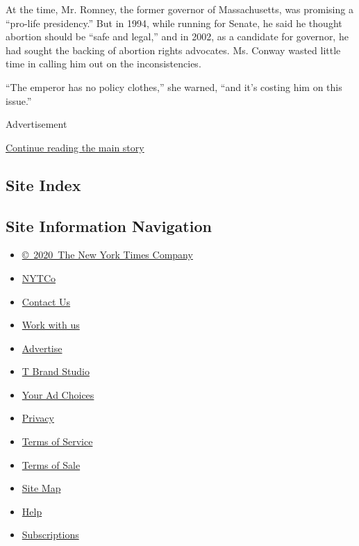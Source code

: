 At the time, Mr. Romney, the former governor of Massachusetts, was
promising a ``pro-life presidency.'' But in 1994, while running for
Senate, he said he thought abortion should be ``safe and legal,'' and in
2002, as a candidate for governor, he had sought the backing of abortion
rights advocates. Ms. Conway wasted little time in calling him out on
the inconsistencies.

``The emperor has no policy clothes,'' she warned, ``and it's costing
him on this issue.''

Advertisement

\protect\hyperlink{after-bottom}{Continue reading the main story}

\hypertarget{site-index}{%
\subsection{Site Index}\label{site-index}}

\hypertarget{site-information-navigation}{%
\subsection{Site Information
Navigation}\label{site-information-navigation}}

\begin{itemize}
\tightlist
\item
  \href{https://help.nytimes3xbfgragh.onion/hc/en-us/articles/115014792127-Copyright-notice}{©~2020~The
  New York Times Company}
\end{itemize}

\begin{itemize}
\tightlist
\item
  \href{https://www.nytco.com/}{NYTCo}
\item
  \href{https://help.nytimes3xbfgragh.onion/hc/en-us/articles/115015385887-Contact-Us}{Contact
  Us}
\item
  \href{https://www.nytco.com/careers/}{Work with us}
\item
  \href{https://nytmediakit.com/}{Advertise}
\item
  \href{http://www.tbrandstudio.com/}{T Brand Studio}
\item
  \href{https://www.nytimes3xbfgragh.onion/privacy/cookie-policy\#how-do-i-manage-trackers}{Your
  Ad Choices}
\item
  \href{https://www.nytimes3xbfgragh.onion/privacy}{Privacy}
\item
  \href{https://help.nytimes3xbfgragh.onion/hc/en-us/articles/115014893428-Terms-of-service}{Terms
  of Service}
\item
  \href{https://help.nytimes3xbfgragh.onion/hc/en-us/articles/115014893968-Terms-of-sale}{Terms
  of Sale}
\item
  \href{https://spiderbites.nytimes3xbfgragh.onion}{Site Map}
\item
  \href{https://help.nytimes3xbfgragh.onion/hc/en-us}{Help}
\item
  \href{https://www.nytimes3xbfgragh.onion/subscription?campaignId=37WXW}{Subscriptions}
\end{itemize}
